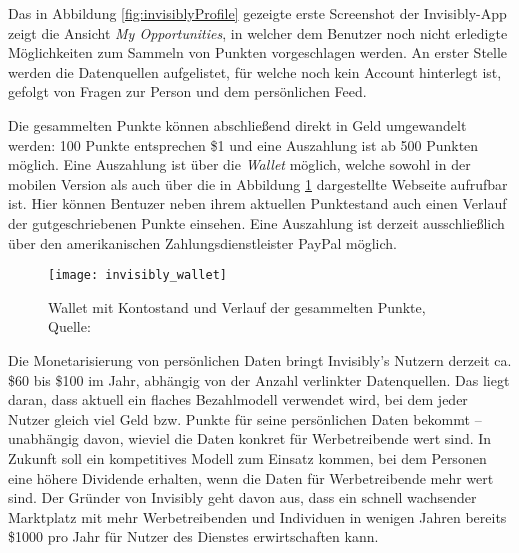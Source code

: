 \noindent Das in Abbildung \ref{fig:invisiblyProfile} gezeigte erste Screenshot der Invisibly-App zeigt die Ansicht \textit{My Opportunities}, in welcher dem Benutzer noch nicht erledigte Möglichkeiten zum Sammeln von Punkten vorgeschlagen werden. An erster Stelle werden die Datenquellen aufgelistet, für welche noch kein Account hinterlegt ist, gefolgt von Fragen zur Person und dem persönlichen Feed. \newline

\noindent Die gesammelten Punkte können abschließend direkt in Geld umgewandelt werden: 100 Punkte entsprechen \$1 und eine Auszahlung ist ab 500 Punkten möglich. \cite{invisiblyWhyPay_2021} Eine Auszahlung ist über die \textit{Wallet} möglich, welche sowohl in der mobilen Version als auch über die in Abbildung \ref{fig:invisiblyWallet} dargestellte Webseite aufrufbar ist. Hier können Bentuzer neben ihrem aktuellen Punktestand auch einen Verlauf der gutgeschriebenen Punkte einsehen. Eine Auszahlung ist derzeit ausschließlich über den amerikanischen Zahlungsdienstleister PayPal möglich. \newline

\begin{figure}[!ht]
	\centering
	\texttt{[image: invisibly\_wallet]}
	\caption{Wallet mit Kontostand und Verlauf der gesammelten Punkte, Quelle: \cite{behanceInvisibly_2021}}
	\label{fig:invisiblyWallet}
\end{figure}

\noindent Die Monetarisierung von persönlichen Daten bringt Invisibly's Nutzern derzeit ca. \$60 bis \$100 im Jahr, abhängig von der Anzahl verlinkter Datenquellen. Das liegt daran, dass aktuell ein flaches Bezahlmodell verwendet wird, bei dem jeder Nutzer gleich viel Geld bzw. Punkte für seine persönlichen Daten bekommt -- unabhängig davon, wieviel die Daten konkret für Werbetreibende wert sind. In Zukunft soll ein kompetitives Modell zum Einsatz kommen, bei dem Personen eine höhere Dividende erhalten, wenn die Daten für Werbetreibende mehr wert sind. \cite{pymntsInvisibly_2021} Der Gründer von Invisibly geht davon aus, dass ein schnell wachsender Marktplatz mit mehr Werbetreibenden und Individuen in wenigen Jahren bereits \$1000 pro Jahr für Nutzer des Dienstes erwirtschaften kann. \cite{techRadarInvisibly_2021} 